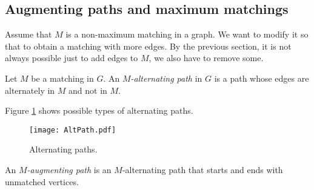 \begin{page}

\subsection{Augmenting paths and maximum matchings}
Assume that $M$ is a non-maximum matching in a graph.
We want to modify it so that to obtain a matching with more edges.
By the previous section, it is not always possible just to add edges to $M$, we also have to remove some.


\end{page}

\begin{page}

\begin{dfn}
Let $M$ be a matching in $G$.
An \emph{$M$-alternating path} in $G$ is a path whose edges are alternately in $M$ and not in $M$.
\end{dfn}

\end{page}

\begin{page}


Figure \ref{fig:AltPath} shows possible types of alternating paths.

\begin{figure}[ht]
\begin{center}
\texttt{[image: AltPath.pdf]}
\end{center}
\caption{Alternating paths.}
\label{fig:AltPath}
\end{figure}


\end{page}

\begin{page}

\begin{dfn}
An \emph{$M$-augmenting path} is an $M$-alternating path that starts and ends with unmatched vertices.
\end{dfn}

\end{page}

